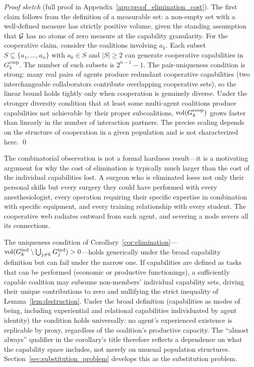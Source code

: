 \emph{Proof sketch} (full proof in Appendix~\ref{app:proof_elimination_cost}).
The first claim follows from the definition of a
measurable set: a non-empty set with a well-defined measure has strictly
positive volume, given the standing assumption that $\mathcal{G}$ has no atoms of zero
measure at the capability granularity. For the cooperative claim, consider the
coalitions involving $a_k$. Each subset $S \subseteq \{a_1, \ldots, a_n\}$ with
$a_k \in S$ and $|S| \geq 2$ can generate cooperative capabilities in
$G^{\mathrm{coop}}_{k}$. The number of such subsets is $2^{n-1} - 1$. The pair-uniqueness condition is
strong: many real pairs of agents produce redundant cooperative capabilities
(two interchangeable collaborators contribute overlapping cooperative sets),
so the linear bound holds tightly only when cooperation is genuinely diverse.
Under the stronger diversity condition that at least some multi-agent coalitions
produce capabilities not achievable by their proper subcoalitions,
$\operatorname{vol}(G^{\mathrm{coop}}_{k})$ grows faster than linearly in the number of
interaction partners. The precise scaling
depends on the structure of cooperation in a given population and is not
characterized here. \qed

The combinatorial observation is not a formal hardness result---it is a
motivating argument for why the cost of elimination is typically much larger
than the cost of the individual capabilities lost. A surgeon who is eliminated
loses not only their personal skills but every surgery they could have
performed with every anesthesiologist, every operation requiring their specific
expertise in combination with specific equipment, and every training
relationship with every student. The cooperative web radiates outward from each
agent, and severing a node severs all its connections.

\begin{remark}
\label{rem:substitution_scope}
The uniqueness condition of Corollary~\ref{cor:elimination}---$\operatorname{vol}(G_{k}^{\mathrm{ind}}
    \setminus \bigcup_{j \neq k} G_{j}^{\mathrm{ind}}) > 0$---holds generically under the
    broad capability definition but can fail under the narrow one. If
    capabilities are defined as tasks that can be performed (economic or
    productive functionings), a sufficiently capable coalition may subsume
    non-members' individual capability sets, driving their unique contributions
    to zero and nullifying the strict inequality of
    Lemma~\ref{lem:destruction}. Under the broad definition (capabilities as
    modes of being, including experiential and relational capabilities
    individuated by agent identity) the condition holds universally: no
    agent's experienced existence is replicable by proxy, regardless of the
    coalition's productive capacity. The ``almost always'' qualifier in the
    corollary's title therefore reflects a dependence on what the capability
    space includes, not merely on unusual population structures.
    Section~\ref{sec:substitution_problem} develops this as the substitution
    problem.
\end{remark}

